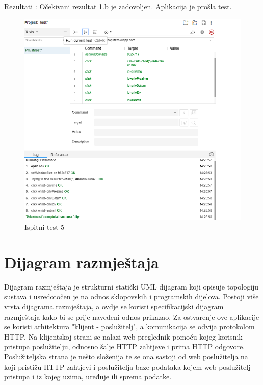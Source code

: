 			\noindent Rezultati : Očekivani rezultat 1.b je zadovoljen. Aplikacija je prošla test. 

			\begin{figure}[H]
				\includegraphics[width=1\linewidth]{slike/ispitni_test_5.png} %
				\caption{Ispitni test 5}
				\label{fig:Test5} %
			\end{figure}

			\eject 
		
		
		\section{Dijagram razmještaja}
			
			 Dijagram razmještaja je strukturni statički UML dijagram koji opisuje topologiju sustava i usredotočen je na odnos sklopovskih i programskih dijelova. Postoji više vrsta dijagrama razmještaja, a ovdje se koristi specifikacijski dijagram razmještaja kako bi se prije navedeni odnos prikazao. Za ostvarenje ove aplikacije se koristi arhitektura "klijent - poslužitelj", a komunikacija se odvija protokolom HTTP. Na klijentskoj strani se nalazi web preglednik pomoću kojeg korisnik pristupa poslužitelju, odnosno šalje HTTP zahtjeve i prima HTTP odgovore. Poslužiteljska strana je nešto složenija te se ona sastoji od web poslužitelja na koji pristižu HTTP zahtjevi i poslužitelja baze podataka kojem web poslužitelj pristupa i iz kojeg uzima, uređuje ili sprema podatke.
			 
